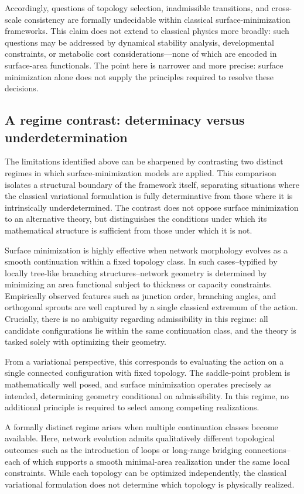 Accordingly, questions of topology selection, inadmissible transitions, and cross-scale consistency are formally undecidable within classical surface-minimization frameworks. This claim does not extend to classical physics more broadly: such questions may be addressed by dynamical stability analysis, developmental constraints, or metabolic cost considerations---none of which are encoded in surface-area functionals. The point here is narrower and more precise: surface minimization alone does not supply the principles required to resolve these decisions.

\subsection{A regime contrast: determinacy versus underdetermination}

The limitations identified above can be sharpened by contrasting two distinct regimes in which surface-minimization models are applied. This comparison isolates a structural boundary of the framework itself, separating situations where the classical variational formulation is fully determinative from those where it is intrinsically underdetermined. The contrast does not oppose surface minimization to an alternative theory, but distinguishes the conditions under which its mathematical structure is sufficient from those under which it is not.

Surface minimization is highly effective when network morphology evolves as a smooth continuation within a fixed topology class. In such cases--typified by locally tree-like branching structures--network geometry is determined by minimizing an area functional subject to thickness or capacity constraints. Empirically observed features such as junction order, branching angles, and orthogonal sprouts are well captured by a single classical extremum of the action. Crucially, there is no ambiguity regarding admissibility in this regime: all candidate configurations lie within the same continuation class, and the theory is tasked solely with optimizing their geometry.

From a variational perspective, this corresponds to evaluating the action on a single connected configuration with fixed topology. The saddle-point problem is mathematically well posed, and surface minimization operates precisely as intended, determining geometry conditional on admissibility. In this regime, no additional principle is required to select among competing realizations.

A formally distinct regime arises when multiple continuation classes become available. Here, network evolution admits qualitatively different topological outcomes--such as the introduction of loops or long-range bridging connections--each of which supports a smooth minimal-area realization under the same local constraints. While each topology can be optimized independently, the classical variational formulation does not determine which topology is physically realized.

